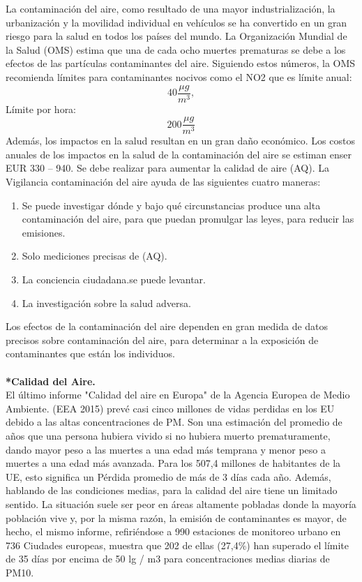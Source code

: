 \documentclass[10pt,a4paper]{article}
\begin{document}
\begin{multicols}{2}
La contaminación del aire, como resultado de una mayor industrialización, la urbanización y la movilidad individual en vehículos se ha convertido en un gran riesgo para la salud en todos los países del mundo. La Organización Mundial de la Salud (OMS) estima que una de cada ocho muertes prematuras se debe a los efectos de las partículas contaminantes del aire. 
Siguiendo estos números, la OMS recomienda límites para contaminantes nocivos como el NO2 que es límite anual: \[40\frac{\mu {g}}{m^3}
,\] Límite por hora: \[200\frac{\mu{g}}{m^3}\]
Además, los impactos en la salud resultan en un gran daño económico. Los costos anuales de los impactos en la salud de la contaminación del aire se estiman enser EUR 330 – 940. Se debe realizar para aumentar la calidad de aire (AQ).
La Vigilancia contaminación del aire ayuda de las siguientes cuatro maneras:
\begin{enumerate}[1.]
\item Se puede investigar dónde y bajo qué circunstancias produce una alta contaminación del aire, para que puedan promulgar las leyes, para reducir las emisiones.
\item Solo mediciones precisas de (AQ).
\item La conciencia ciudadana.se puede levantar. 
\item La investigación sobre la salud adversa.
\end{enumerate}
Los efectos de la contaminación del aire dependen en gran medida de datos precisos sobre contaminación del aire, para determinar a la exposición de contaminantes que están los individuos.\\
\\
\textbf{*Calidad del Aire.}\\
El último informe "Calidad del aire en Europa" de la Agencia Europea de Medio Ambiente. (EEA 2015) prevé casi cinco millones de vidas perdidas en los EU debido a las altas concentraciones de PM.
Son una estimación del promedio de años que una persona hubiera vivido si no hubiera muerto prematuramente, dando mayor peso a las muertes a una edad más temprana y menor peso a muertes a una edad más avanzada. Para los 507,4 millones de habitantes de la UE, esto significa un Pérdida promedio de más de 3 días cada año.
Además, hablando de las condiciones medias, para la calidad del aire tiene un limitado sentido. La situación suele ser peor en áreas altamente pobladas donde la mayoría población vive y, por la misma razón, la emisión de contaminantes es mayor, de hecho, el mismo informe, refiriéndose a 990 estaciones de monitoreo urbano en 736 Ciudades europeas, muestra que 202 de ellas (27,4\%) han superado el límite de 35 días por encima de 50 lg / m3 para concentraciones medias diarias de PM10.

\end{multicols}
\end{document}
